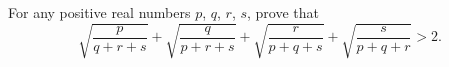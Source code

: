 For any positive real numbers $p$, $q$, $r$, $s$, prove that
\[
\sqrt{\dfrac{p}{q+r+s}}+\sqrt{\dfrac{q}{p+r+s}}+\sqrt{\dfrac{r}{p+q+s}}+\sqrt{\dfrac{s}{p+q+r}}>2 .
\]
